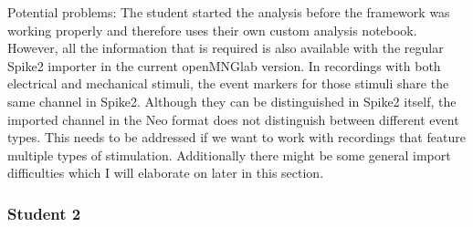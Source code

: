 Potential problems: The student started the analysis before the framework was working properly and therefore uses their own custom analysis notebook. However, all the information that is required is also available with the regular Spike2 importer in the current openMNGlab version.
In recordings with both electrical and mechanical stimuli, the event markers for those stimuli share the same channel in Spike2. Although they can be distinguished in Spike2 itself, the imported channel in the Neo format does not distinguish between different event types. This needs to be addressed if we want to work with recordings that feature multiple types of stimulation.
Additionally there might be some general import difficulties which I will elaborate on later in this section.
 
\subsubsection{Student 2}


